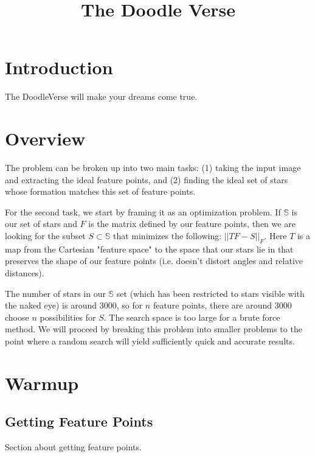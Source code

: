 \documentclass[paper=a4, fontsize=11pt]{scrartcl} %
\title{
\normalfont \normalsize
\huge The Doodle Verse \\ %
}
\date{}
\begin{document}
\maketitle

\section{Introduction}

The DoodleVerse will make your dreams come true.

\section{Overview}

The problem can be broken up into two main tasks: (1) taking the input image and extracting the ideal feature points, and (2) finding the ideal set of stars whose formation matches this set of feature points.

For the second task, we start by framing it as an optimization problem. If $\mathbb{S}$ is our set of stars and $F$ is the matrix defined by our feature points, then we are looking for the subset $S\subset\mathbb{S}$ that minimizes the following: $||TF - S||_F$.  Here $T$ is a map from the Cartesian "feature space" to the space that our stars lie in that preserves the shape of our feature points (i.e. doesn't distort angles and relative distances).

The number of stars in our $\mathbb{S}$ set (which has been restricted to stars visible with the naked eye) is around 3000, so for $n$ feature points, there are around 3000 choose $n$ possibilities for $S$. The search space is too large for a brute force method.  We will proceed by breaking this problem into smaller problems to the point where a random search will yield sufficiently quick and accurate results.
\section{Warmup}

\subsection{Getting Feature Points}

Section about getting feature points.
\end{document}
